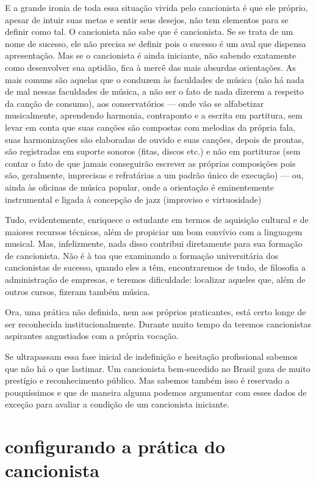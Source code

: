 E a grande ironia de toda essa situação vivida pelo cancionista é que
ele próprio, apesar de intuir suas metas e sentir seus desejos, não tem
elementos para se definir como tal. O cancionista não sabe que é
cancionista. Se se trata de um nome de sucesso, ele não precisa se
definir pois o sucesso é um aval que dispensa apresentação. Mas se o
cancionista é ainda iniciante, não sabendo exatamente como desenvolver
sua aptidão, fica à mercê das mais absurdas orientações. As mais comuns
são aquelas que o conduzem às faculdades de música (não há nada de mal
nessas faculdades de música, a não ser o fato de nada dizerem a respeito
da canção de consumo), aos conservatórios --- onde vão se alfabetizar
musicalmente, aprendendo harmonia, contraponto e a escrita em partitura,
sem levar em conta que suas canções são compostas com melodias da
própria fala, suas harmonizações são elaboradas de ouvido e suas
canções, depois de prontas, são registradas em suporte sonoros (fitas,
discos etc.) e não em partituras (sem contar o fato de que jamais
conseguirão escrever as próprias composições pois são, geralmente,
imprecisas e refratárias a um padrão único de execução) --- ou, ainda às
oficinas de música popular, onde a orientação é eminentemente
instrumental e ligada à concepção de jazz (improviso e virtuosidade)

Tudo, evidentemente, enriquece o estudante em termos de aquisição
cultural e de maiores recursos técnicos, além de propiciar um bom
convívio com a linguagem musical. Mas, infelizmente, nada disso
contribui diretamente para sua formação de cancionista. Não é à toa que
examinando a formação universitária dos cancionistas de sucesso, quando
eles a têm, encontraremos de tudo, de filosofia a administração de
empresas, e teremos dificuldade: localizar aqueles que, além de outros
cursos, fizeram também música.

Ora, uma prática não definida, nem aos próprios praticantes, está certo
longe de ser reconhecida institucionalmente. Durante muito tempo da
teremos cancionistas aspirantes angustiados com a própria vocação.

Se ultrapassam essa fase inicial de indefinição e hesitação profissional
sabemos que não há o que lastimar. Um cancionista bem-sucedido no Brasil
goza de muito prestígio e reconhecimento público. Mas sabemos também
isso é reservado a pouquíssimos e que de maneira alguma podemos
argumentar com esses dados de exceção para avaliar a condição de um
cancionista iniciante.

\section{configurando a prática do cancionista}

